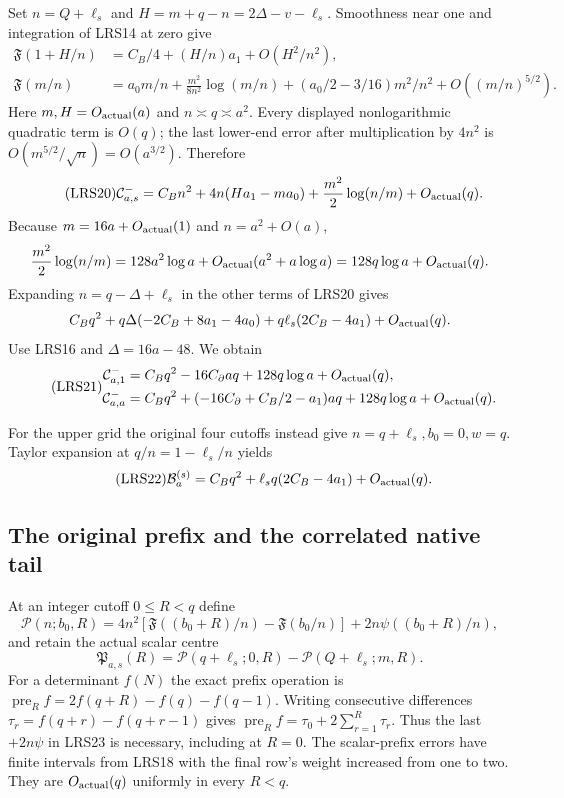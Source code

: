 Set $n=Q+\ell_s$ and $H=m+q-n=2\Delta-v-\ell_s$.
Smoothness near one and integration of LRS14 at zero give
\[
\begin{split}
 \mathfrak F(1+H/n)&=C_B/4+(H/n)a_1+O(H^2/n^2),\\
 \mathfrak F(m/n)&=a_0m/n+\frac{m^2}{8n^2}\log(m/n)
                  +(a_0/2-3/16)m^2/n^2+O((m/n)^{5/2}).
\end{split}
\]
Here $m,H=O_{\rm actual}(a)$ and $n\asymp q\asymp a^2$.
Every displayed nonlogarithmic quadratic term is $O(q)$; the
last lower-end error after multiplication by $4n^2$ is
$O(m^{5/2}/\sqrt n)=O(a^{3/2})$.  Therefore
\begin{equation}\tag{LRS20}
 \mathcal C^-_{a,s}=C_Bn^2+4n(Ha_1-ma_0)
                    +\frac{m^2}{2}\log(n/m)+O_{\rm actual}(q).
\end{equation}
Because $m=16a+O_{\rm actual}(1)$ and $n=a^2+O(a)$,
\[
 \frac{m^2}{2}\log(n/m)
 =128a^2\log a+O_{\rm actual}(a^2+a\log a)
 =128q\log a+O_{\rm actual}(q).
\]
Expanding $n=q-\Delta+\ell_s$ in the other terms of LRS20 gives
\[
 C_Bq^2+q\Delta(-2C_B+8a_1-4a_0)
            +q\ell_s(2C_B-4a_1)+O_{\rm actual}(q).
\]
Use LRS16 and $\Delta=16a-48$.  We obtain
\begin{equation}\tag{LRS21}
\begin{split}
 \mathcal C^-_{a,1}
 &=C_Bq^2-16C_\partial aq+128q\log a+O_{\rm actual}(q),\\
 \mathcal C^-_{a,a}
 &=C_Bq^2+(-16C_\partial+C_B/2-a_1)aq
                +128q\log a+O_{\rm actual}(q).
\end{split}
\end{equation}

For the upper grid the original four cutoffs instead give
$n=q+\ell_s,b_0=0,w=q$.  Taylor expansion at
$q/n=1-\ell_s/n$ yields
\begin{equation}\tag{LRS22}
 \mathcal B_a^{(s)}=C_Bq^2+\ell_sq(2C_B-4a_1)
                         +O_{\rm actual}(q).
\end{equation}

\subsection{The original prefix and the correlated native tail}

At an integer cutoff $0\le R<q$ define
\[
 \mathscr P(n;b_0,R)=4n^2[
  \mathfrak F((b_0+R)/n)-\mathfrak F(b_0/n)]
       +2n\psi((b_0+R)/n),
\]
and retain the actual scalar centre
\begin{equation}\tag{LRS23}
 \mathfrak P_{a,s}(R)=\mathscr P(q+\ell_s;0,R)
                    -\mathscr P(Q+\ell_s;m,R).
\end{equation}
For a determinant $f(N)$ the exact prefix operation is
$\operatorname{pre}_Rf=2f(q+R)-f(q)-f(q-1)$.
Writing consecutive differences $\tau_r=f(q+r)-f(q+r-1)$ gives
$\operatorname{pre}_Rf=\tau_0+2\sum_{r=1}^R\tau_r$.
Thus the last $+2n\psi$ in LRS23 is necessary, including at $R=0$.
The scalar-prefix errors have finite intervals from LRS18 with
the final row's weight increased from one to two.  They are
$O_{\rm actual}(q)$ uniformly in every $R<q$.

